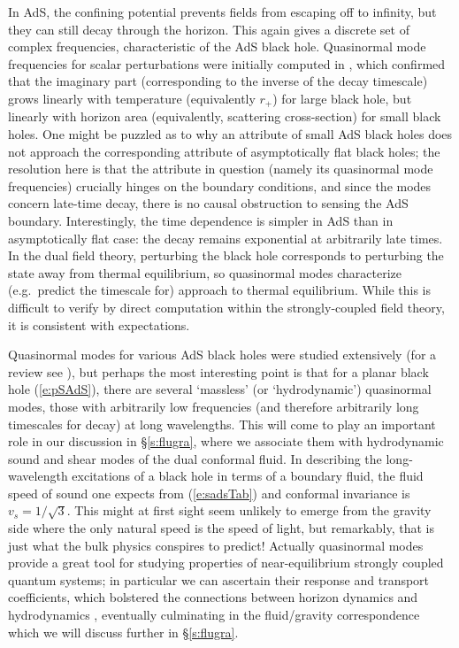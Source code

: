 \documentclass[12pt]{article}
\def\sect#1{\S\ref{#1}}
\def\req#1{(\ref{#1})}
\def\rh{r_+}
\begin{document}
In AdS, the confining potential prevents fields from escaping off to infinity, but they can still decay through the horizon.  This again gives a discrete set of complex frequencies, characteristic of the AdS black hole.
Quasinormal mode frequencies for scalar perturbations were initially computed in \cite{Horowitz:1999jd}, which  confirmed that the imaginary part (corresponding to the inverse of the decay timescale)  grows linearly with temperature (equivalently $\rh$) for large black hole, but linearly with horizon area (equivalently, scattering cross-section) for small black holes.  One might be puzzled as to why an attribute of small AdS black holes does not approach the corresponding attribute of asymptotically flat black holes; the resolution here is that the attribute in question (namely its quasinormal mode frequencies) crucially hinges on the boundary conditions, and since the modes concern late-time decay, there is no causal obstruction to sensing the AdS boundary.
Interestingly, the time dependence is simpler in AdS than in asymptotically flat case:
 the decay remains  exponential at arbitrarily late times. 
 In the dual field theory, perturbing the black hole corresponds to perturbing the state away from thermal equilibrium, so quasinormal modes  characterize (e.g.\ predict the timescale for) approach to thermal equilibrium.  While this is difficult to verify by direct computation within the strongly-coupled field theory, it is consistent with expectations.

Quasinormal modes for various AdS black holes were  studied extensively (for a review see \cite{Berti:2009kk}), but perhaps the most interesting point is that for  a planar black hole \req{e:pSAdS}, there are several `massless' (or `hydrodynamic') quasinormal modes, those with arbitrarily low frequencies (and therefore arbitrarily long timescales for decay) at long wavelengths.  This will come to play an important role in our discussion in \sect{s:flugra}, where we associate them with hydrodynamic sound and shear modes of the dual conformal fluid.  
In describing the long-wavelength excitations of a black hole in terms of a boundary fluid, the fluid speed of sound one expects from \req{e:sadsTab} and conformal invariance is $v_{s} = 1/\sqrt{3}$. This might at first sight seem unlikely to emerge from the gravity side where the only natural speed is the speed of light, but remarkably, that is just what the bulk physics conspires to predict!
Actually quasinormal modes provide a great tool for studying properties of  near-equilibrium strongly coupled quantum systems; in particular we can ascertain their response and transport coefficients, which bolstered the  connections between horizon dynamics and hydrodynamics \cite{Son:2007vk}, eventually culminating in the fluid/gravity correspondence \cite{Bhattacharyya:2008jc} which we will discuss further in \sect{s:flugra}.
\end{document}
